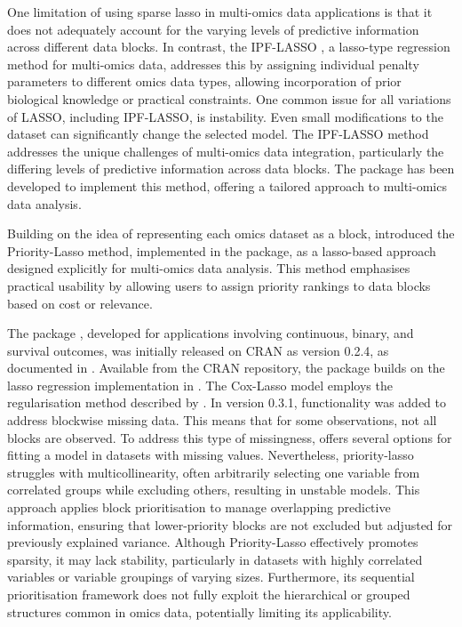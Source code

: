 One limitation of using sparse lasso in multi-omics data applications is that it does not adequately account for the varying levels of predictive information across different data blocks.  In contrast, the IPF-LASSO \citep{BoulesteixIPF-LASSO}, a lasso-type regression method for multi-omics data, addresses this by assigning individual penalty parameters to different omics data types, allowing incorporation of prior biological knowledge or practical constraints. One common issue for all variations of LASSO, including IPF-LASSO, is instability. Even small modifications to the dataset can significantly change the selected model. The IPF-LASSO method addresses the unique challenges of multi-omics data integration, particularly the differing levels of predictive information across data blocks. The  package \citep{boulesteix2015ipflasso} has been developed to implement this method, offering a tailored approach to multi-omics data analysis.

Building on the idea of representing each omics dataset as a block, \cite{Klau2018prioritylasso} introduced the Priority-Lasso method, implemented in the  package, as a lasso-based approach designed explicitly for multi-omics data analysis. This method emphasises practical usability by allowing users to assign priority rankings to data blocks based on cost or relevance.

The package , developed for applications involving continuous, binary, and survival outcomes, was initially released on CRAN as version 0.2.4, as documented in \cite{klau2017prioritylasso}. Available from the CRAN repository, the package builds on the lasso regression implementation in  \citep{friedman2010regularization}. The Cox-Lasso model employs the regularisation method described by \cite{simon2011regularization}. In version 0.3.1, functionality was added to address blockwise missing data. This means that for some observations, not all blocks are observed. To address this type of missingness,  offers several options for fitting a model in datasets with missing values. Nevertheless, priority-lasso struggles with multicollinearity, often arbitrarily selecting one variable from correlated groups while excluding others, resulting in unstable models. This approach applies block prioritisation to manage overlapping predictive information, ensuring that lower-priority blocks are not excluded but adjusted for previously explained variance.
Although Priority-Lasso effectively promotes sparsity, it may lack stability, particularly in datasets with highly correlated variables or variable groupings of varying sizes. Furthermore, its sequential prioritisation framework does not fully exploit the hierarchical or grouped structures common in omics data, potentially limiting its applicability.

